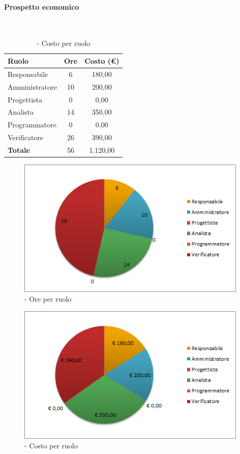 \documentclass[../PianoDiProgetto.tex]{subfiles}
\begin{document}
\vspace{35 mm}	
	
	\paragraph{Prospetto economico}\
	
					\begin{table}[H]
		\centering
	
		\begin{tabular}{l * {2}{c}}
			\toprule
			\textbf{Ruolo} & \textbf{Ore} & \textbf{Costo (\euro{})} \\
			\midrule
			Responsabile &	6 & 180,00 \\
			Amministratore & 10 & 200,00 \\
			Progettista & 0 & 0,00 \\
			Analista & 14 & 350,00 \\
			Programmatore & 0 & 0,00 \\
			Verificatore & 26 & 390,00 \\
			\midrule		
			\textbf{Totale} & 56 & 1.120,00 \\
			\bottomrule 
		\end{tabular}
		\caption{\PerAD{} - Costo per ruolo}
	\end{table}
\vfill
\newpage
	
	\begin{figure}[H]
		\centering
		\includegraphics[width=11cm, trim=1cm 0cm 1cm 0cm]{grafici/AD-ruolo}
			\caption{\PerAD{} - Ore per ruolo}
	\end{figure}
\vfill
	\begin{figure}[H]
		\centering
		\includegraphics[width=11cm, trim=1cm 0cm 1cm 0cm]{grafici/AD-costo}
			\caption{\PerAD{} - Costo per ruolo}
	\end{figure}
\vfill		
\newpage	
\end{document}
